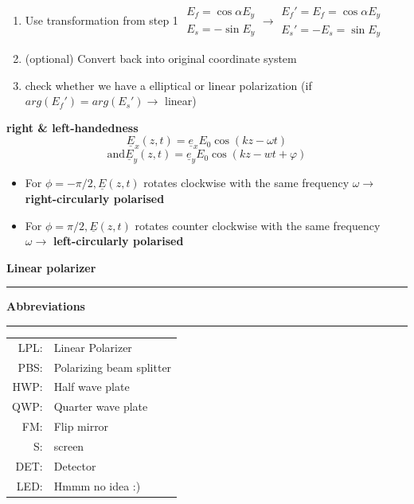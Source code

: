 {\begin{enumerate}[label=\protect\circled{\arabic*}]
	\item Use transformation from step 1\newline
	      $\begin{matrix} E_f = \cos\alpha E_y \\ E_s = -\sin E_y \end{matrix} \rightarrow \begin{matrix} E_f' = E_f =\cos\alpha E_y \\ E_s' = -E_s = \sin E_y \end{matrix}$
	\item (optional) Convert back into original coordinate system
	\item check whether we have a elliptical or linear polarization (if $arg(E_f') = arg(E_s') \rightarrow$ linear)
\end{enumerate}

\textbf{right \& left-handedness}
$$  \underline{E}_x(z,t) = \underline{e}_x E_0 \cos(kz-\omega t)$$
$$\text{and} \underline{E}_y(z,t) = \underline{e}_y E_0 \cos(kz -wt + \varphi) $$
\begin{itemize}
	\item For $\phi = -\pi/2, \underline{E}(z,t)$ rotates clockwise with the same frequency $\omega \longrightarrow$ \textbf{right-circularly polarised}
	\item For $\phi = \pi/2, \underline{E}(z,t)$ rotates counter clockwise with the same frequency $\omega \longrightarrow$ \textbf{left-circularly polarised}
\end{itemize}

\vspace{2mm}
\normalsize\textbf{Linear polarizer}\small
\hrule
{}

\vspace{2mm}
\normalsize\textbf{Abbreviations}\small
\hrule

\begin{tabular}{rl}
	LPL: & Linear Polarizer         \\
	PBS: & Polarizing beam splitter \\
	HWP: & Half wave plate          \\
	QWP: & Quarter wave plate       \\
	FM:  & Flip mirror              \\
	S:   & screen                   \\
	DET: & Detector                 \\
	LED: & Hmmm no idea :)
\end{tabular}

}

